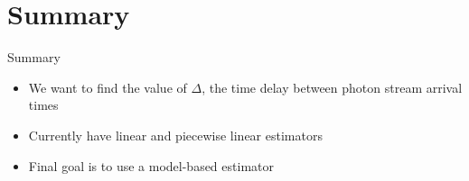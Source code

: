 \documentclass{beamer}
\begin{document}
\section*{Summary}

\begin{frame}{Summary}

  \begin{itemize}
  \item
    We want to find the value of $\Delta$, the time delay between photon stream arrival times
  \item
    Currently have linear and piecewise linear estimators
  \item
    Final goal is to use a model-based estimator
  \end{itemize}
\end{frame}
\end{document}
